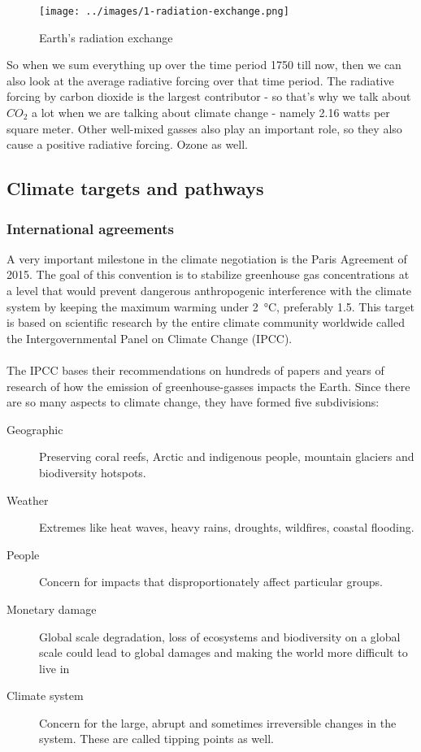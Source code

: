 \documentclass[../summary.tex]{subfiles}
\begin{document}
				\begin{figure}[h]
					\centering
					\texttt{[image: ../images/1-radiation-exchange.png]}
					\caption{Earth's radiation exchange}
					\label{fig:1-radiation-exchange}
				\end{figure}
				\newpage
				So when we sum everything up over the time period 1750 till now, then we can also look at the average radiative forcing over that time period. The radiative forcing by carbon dioxide is the largest contributor - so that's why we talk about $CO_2$ a lot when we are talking about climate change - namely 2.16 watts per square meter. Other well-mixed gasses also play an important role, so they also cause a positive radiative forcing. Ozone as well.
				
		\subsection{Climate targets and pathways}
			\subsubsection{International agreements}
				A very important milestone in the climate negotiation is the Paris Agreement of 2015. The goal of this convention is to stabilize greenhouse gas concentrations at a level that would prevent dangerous anthropogenic interference with the climate system by keeping the maximum warming under \SI{2}{\degreeCelsius}, preferably 1.5. This target is based on scientific research by the entire climate community worldwide called the Intergovernmental Panel on Climate Change (IPCC).
				\\\\
				The IPCC bases their recommendations on hundreds of papers and years of research of how the emission of greenhouse-gasses impacts the Earth. Since there are so many aspects to climate change, they have formed five subdivisions:
				\begin{description}
					\item[Geographic] Preserving coral reefs, Arctic and indigenous people, mountain glaciers and biodiversity hotspots.
					\item[Weather] Extremes like heat waves, heavy rains, droughts, wildfires, coastal flooding.
					\item[People] Concern for impacts that disproportionately affect particular groups.
					\item[Monetary damage] Global scale degradation, loss of ecosystems and biodiversity on a global scale could lead to global damages and making the world more difficult to live in
					\item[Climate system] Concern for the large, abrupt and sometimes irreversible changes in the system. These are called tipping points as well.
				\end{description} 
			
\end{document}
